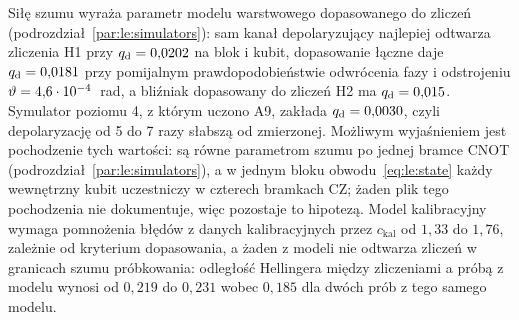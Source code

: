 Siłę szumu wyraża parametr modelu warstwowego dopasowanego do zliczeń (podrozdział~\ref{par:le:simulators}): sam kanał depolaryzujący najlepiej odtwarza zliczenia H1 przy $q_{\mathrm{d}}=0{,}0202$ na blok i kubit, dopasowanie łączne daje $q_{\mathrm{d}}=0{,}0181$ przy pomijalnym prawdopodobieństwie odwrócenia fazy i odstrojeniu $\vartheta=4{,}6\cdot10^{-4}$~rad, a bliźniak dopasowany do zliczeń H2 ma $q_{\mathrm{d}}=0{,}015$.
Symulator poziomu 4, z którym uczono A9, zakłada $q_{\mathrm{d}}=0{,}0030$, czyli depolaryzację od 5 do 7 razy słabszą od zmierzonej.
Możliwym wyjaśnieniem jest pochodzenie tych wartości: są równe parametrom szumu po jednej bramce CNOT (podrozdział~\ref{par:le:simulators}), a w jednym bloku obwodu~\eqref{eq:le:state} każdy wewnętrzny kubit uczestniczy w czterech bramkach CZ; żaden plik tego pochodzenia nie dokumentuje, więc pozostaje to hipotezą.
Model kalibracyjny wymaga pomnożenia błędów z danych kalibracyjnych przez $c_{\mathrm{kal}}$ od $1{,}33$ do $1{,}76$, zależnie od kryterium dopasowania, a żaden z modeli nie odtwarza zliczeń w granicach szumu próbkowania: odległość Hellingera między zliczeniami a próbą z modelu wynosi od $0{,}219$ do $0{,}231$ wobec $0{,}185$ dla dwóch prób z tego samego modelu.

